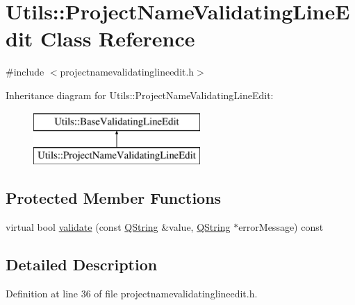 \hypertarget{class_utils_1_1_project_name_validating_line_edit}{\section{\-Utils\-:\-:\-Project\-Name\-Validating\-Line\-Edit \-Class \-Reference}
\label{class_utils_1_1_project_name_validating_line_edit}
}


{\ttfamily \#include $<$projectnamevalidatinglineedit.\-h$>$}

\-Inheritance diagram for \-Utils\-:\-:\-Project\-Name\-Validating\-Line\-Edit\-:\begin{figure}[H]
\begin{center}
\leavevmode
\includegraphics[height=2.000000cm]{class_utils_1_1_project_name_validating_line_edit}
\end{center}
\end{figure}
\subsection*{\-Protected \-Member \-Functions}
\begin{DoxyCompactItemize}
\item 
virtual bool \hyperlink{class_utils_1_1_project_name_validating_line_edit_a165faa03d37c30304d0049eb57513988}{validate} (const \hyperlink{group___u_a_v_objects_plugin_gab9d252f49c333c94a72f97ce3105a32d}{\-Q\-String} \&value, \hyperlink{group___u_a_v_objects_plugin_gab9d252f49c333c94a72f97ce3105a32d}{\-Q\-String} $\ast$error\-Message) const 
\end{DoxyCompactItemize}


\subsection{\-Detailed \-Description}


\-Definition at line 36 of file projectnamevalidatinglineedit.\-h.



